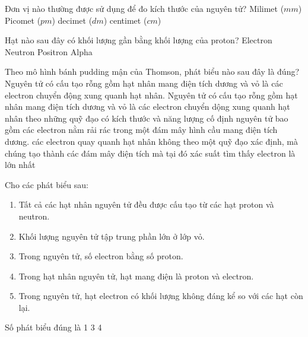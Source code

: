 \begin{ex}
	Đơn vị nào thường được sử dụng để đo kích thước của nguyên tử?
	\choice
	{Milimet ($mm$)}
	{\True Picomet ($pm$)}
	{decimet ($dm$)}
	{centimet ($cm$)}
\end{ex}

\begin{ex}
	Hạt nào sau đây có khối lượng gần bằng khối lượng của proton?
	\choice
	{Electron}
	{\True Neutron}
	{Positron}
	{Alpha}
\end{ex}
\begin{ex}
	Theo mô hình bánh pudding mận của Thomson, phát biểu nào sau đây là đúng?
	\choice
	{%
		Nguyên tử có cấu tạo rỗng gồm hạt nhân mang điện tích dương và vỏ là các electron chuyển động xung quanh hạt nhân.
	}
	{%
		Nguyên tử có cấu tạo rỗng gồm hạt nhân mang điện tích dương và vỏ là các electron chuyển dộng xung quanh hạt nhân theo những quỹ đạo có kích thước và năng lượng cố định
	}
	{%
		\True	nguyên tử bao gồm các electron nằm rải rác trong một đám mây hình cầu mang điện tích dương.
	}
	{%
		các electron  quay quanh hạt nhân không theo một quỹ đạo xác định, mà chúng tạo thành các đám mây điện tích mà tại đó xác suất tìm thấy electron là lớn nhất
	}
\end{ex}

\begin{ex}
	Cho các phát biểu sau:
	\begin{enumerate}[(1)]
		\item Tất cả các hạt nhân nguyên tử đều được cấu tạo từ các hạt proton và neutron.
		\item Khối lượng nguyên tử tập trung phần lớn ở lớp vỏ.
		\item Trong nguyên tử, số electron bằng số proton.
		\item Trong hạt nhân nguyên tử, hạt mang điện là proton và electron.
		\item Trong nguyên tử, hạt electron có khối lượng không đáng kể so với các hạt còn lại.
	\end{enumerate}
	Số phát biểu đúng là
	\choice
	{%
		1
	}
	{%
	}
	{%
		3
	}
	{%
		4
	}
\end{ex}

